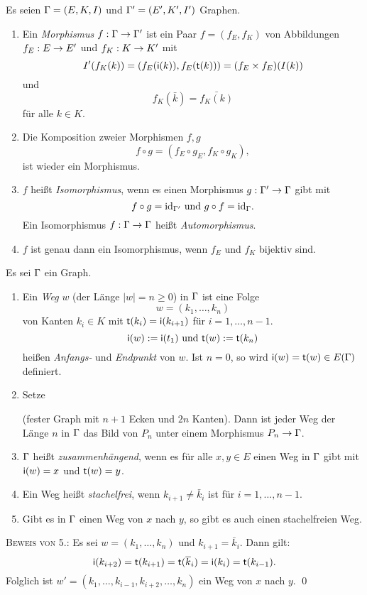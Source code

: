 \DB Es seien $\Gamma=(E,K,I)$ und $\Gamma'=(E',K',I')$ Graphen.
\begin{enumerate}
\item Ein \emph{Morphismus} $f:\Gamma\rightarrow\Gamma'$ ist ein
Paar $f=(f_E,f_K)$ von Abbildungen
$f_E:E\rightarrow E'$ und $f_K:K\rightarrow K'$ mit
\[
I'(f_K(k)) = ( f_E(\mathsf{i}(k)), f_E(\mathsf{t}(k)) )
= (f_E \times f_E)(I(k))
\]
und
\[
f_K(\bar{k}) = \bar{f_K(k)}
\]
für alle $k\in K$.
\item Die Komposition zweier Morphismen $f,g$
\[
f\circ g = (f_E\circ g_E, f_K\circ g_K),
\]
ist wieder ein Morphismus.
\item $f$ heißt \emph{Isomorphismus}, wenn es
einen Morphismus $g:\Gamma'\rightarrow\Gamma$ gibt mit
\[
f\circ g = \mathrm{id}_{\Gamma'} \text{ und } g\circ f=\mathrm{id}_{\Gamma}.
\]
Ein Isomorphismus $f:\Gamma\rightarrow\Gamma$ heißt \emph{Automorphismus}.
\item $f$ ist genau dann ein Isomorphismus, wenn $f_E$ und $f_K$
bijektiv sind.
\end{enumerate}

\DB Es sei $\Gamma$ ein Graph.
\begin{enumerate}
\item Ein \emph{Weg} $w$ (der Länge $|w|=n\geq 0$) in $\Gamma$
ist eine Folge
\[
w = (k_1,\ldots,k_n)
\]
von Kanten $k_i\in K$ mit $\mathsf{t}(k_i)=\mathsf{i}(k_{i+1})$ für
$i=1,\ldots,n-1$.
\[
\mathsf{i}(w):=\mathsf{i}(t_1) \text{ und } \mathsf{t}(w):=\mathsf{t}(k_n)
\]
heißen \emph{Anfangs-} und \emph{Endpunkt} von $w$.
Ist $n=0$, so wird $\mathsf{i}(w)=\mathsf{t}(w)\in E(\Gamma)$ definiert.
\item Setze
\begin{center}
\end{center}
(fester Graph mit $n+1$ Ecken und $2n$ Kanten).
Dann ist jeder Weg der Länge $n$ in $\Gamma$ das Bild von $P_n$ unter
einem Morphismus $P_n\rightarrow \Gamma$.
\item $\Gamma$ heißt \emph{zusammenhängend},
wenn es für alle $x,y\in E$ einen Weg in $\Gamma$ gibt mit
$\mathsf{i}(w)=x$ und $\mathsf{t}(w)=y$.
\item Ein Weg heißt \emph{stachelfrei},
wenn $k_{i+1}\neq \bar{k}_i$ ist für $i=1,\ldots,n-1$.
\item Gibt es in $\Gamma$ einen Weg von $x$ nach $y$, so gibt es auch
einen stachelfreien Weg.
\end{enumerate}
\textsc{Beweis von 5.:} Es sei $w=(k_1,\ldots,k_n)$ und
$k_{i+1}=\bar{k}_i$. Dann gilt:
\[
\mathsf{i}(k_{i+2}) = \mathsf{t}(k_{i+1}) = \mathsf{t}(\overline{k}_{i})
= \mathsf{i}(k_i) = \mathsf{t}(k_{i-1}).
\]
Folglich ist $w'=(k_1,\ldots,k_{i-1},k_{i+2},\ldots,k_n)$ ein
Weg von $x$ nach $y$.
\qed

